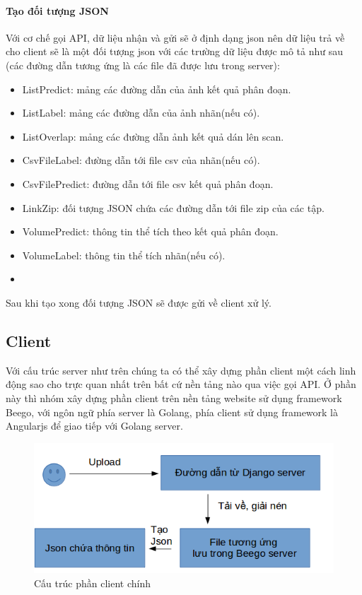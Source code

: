 \paragraph{Tạo đối tượng JSON\\}
Với cơ chế gọi API, dữ liệu nhận và gửi sẽ ở định dạng json nên dữ liệu trả về cho client sẽ là một đối tượng json với các trường dữ liệu được mô tả như sau (các đường dẫn tương ứng là các file đã được lưu trong server):
\begin{itemize}
 \item ListPredict: mảng các đường dẫn của ảnh kết quả phân đoạn.
 \item ListLabel: mảng các đường dẫn của ảnh nhãn(nếu có).
 \item ListOverlap: mảng các đường dẫn ảnh kết quả dán lên scan.
 \item CsvFileLabel: đường dẫn tới file csv của nhãn(nếu có).
 \item CsvFilePredict: đường dẫn tới file csv kết quả phân đoạn.
 \item LinkZip: đối tượng JSON chứa các đường dẫn tới file zip của các tập.
 \item VolumePredict: thông tin thể tích theo kết quả phân đoạn.
 \item VolumeLabel: thông tin thể tích nhãn(nếu có).
 \item 
\end{itemize}
Sau khi tạo xong đối tượng JSON sẽ được gửi về client xử lý.
\subsection{Client}
Với cấu trúc server như trên chúng ta có thể xây dựng phần client một cách linh động sao cho trực quan nhất trên bất cứ nền tảng nào qua việc gọi API. Ở phần này thì nhóm xây dựng phần client trên nền tảng website sử dụng framework Beego, với ngôn ngữ phía server là Golang, phía client sử dụng framework là Angularjs để giao tiếp với Golang server.
\begin{figure}[h]
\centering
    \includegraphics[totalheight=7cm]{Images/app_beego_struct.png}
    \caption{Cấu trúc phần client chính}
    \label{skip_conn}
\end{figure}
